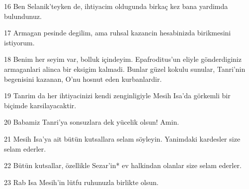 \par 16 Ben Selanik'teyken de, ihtiyacim oldugunda birkaç kez bana yardimda bulundunuz.
\par 17 Armagan pesinde degilim, ama ruhsal kazancin hesabinizda birikmesini istiyorum.
\par 18 Benim her seyim var, bolluk içindeyim. Epafroditus'un eliyle gönderdiginiz armaganlari alinca bir eksigim kalmadi. Bunlar güzel kokulu sunular, Tanri'nin begenisini kazanan, O'nu hosnut eden kurbanlardir.
\par 19 Tanrim da her ihtiyacinizi kendi zenginligiyle Mesih Isa'da görkemli bir biçimde karsilayacaktir.
\par 20 Babamiz Tanri'ya sonsuzlara dek yücelik olsun! Amin.
\par 21 Mesih Isa'ya ait bütün kutsallara selam söyleyin. Yanimdaki kardesler size selam ederler.
\par 22 Bütün kutsallar, özellikle Sezar'in* ev halkindan olanlar size selam ederler.
\par 23 Rab Isa Mesih'in lütfu ruhunuzla birlikte olsun.


